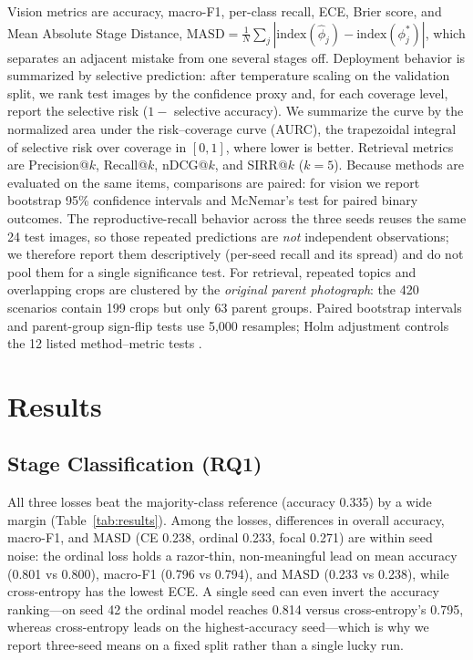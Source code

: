 \documentclass[conference,a4paper]{IEEEtran}
\begin{document}
Vision metrics are accuracy, macro-F1, per-class recall, ECE, Brier score, and Mean Absolute Stage Distance, $\mathrm{MASD}=\frac{1}{N}\sum_j|\mathrm{index}(\hat{\phi}_j)-\mathrm{index}(\phi_j^*)|$, which separates an adjacent mistake from one several stages off. Deployment behavior is summarized by selective prediction: after temperature scaling on the validation split, we rank test images by the confidence proxy and, for each coverage level, report the selective risk ($1-$ selective accuracy). We summarize the curve by the normalized area under the risk--coverage curve (AURC), the trapezoidal integral of selective risk over coverage in $[0,1]$, where lower is better. Retrieval metrics are Precision@$k$, Recall@$k$, nDCG@$k$, and SIRR@$k$ ($k=5$). Because methods are evaluated on the same items, comparisons are paired: for vision we report bootstrap 95\% confidence intervals \cite{efron1993bootstrap} and McNemar's test \cite{mcnemar1947note} for paired binary outcomes. The reproductive-recall behavior across the three seeds reuses the same 24 test images, so those repeated predictions are \emph{not} independent observations; we therefore report them descriptively (per-seed recall and its spread) and do not pool them for a single significance test. For retrieval, repeated topics and overlapping crops are clustered by the \emph{original parent photograph}: the 420 scenarios contain 199 crops but only 63 parent groups. Paired bootstrap intervals and parent-group sign-flip tests use 5{,}000 resamples; Holm adjustment controls the 12 listed method--metric tests \cite{holm1979sequential}.

\section{Results}

\subsection{Stage Classification (RQ1)}

All three losses beat the majority-class reference (accuracy 0.335) by a wide margin (Table~\ref{tab:results}). Among the losses, differences in overall accuracy, macro-F1, and MASD (CE 0.238, ordinal 0.233, focal 0.271) are within seed noise: the ordinal loss holds a razor-thin, non-meaningful lead on mean accuracy (0.801 vs 0.800), macro-F1 (0.796 vs 0.794), and MASD (0.233 vs 0.238), while cross-entropy has the lowest ECE. A single seed can even invert the accuracy ranking---on seed 42 the ordinal model reaches 0.814 versus cross-entropy's 0.795, whereas cross-entropy leads on the highest-accuracy seed---which is why we report three-seed means on a fixed split rather than a single lucky run.
\end{document}
